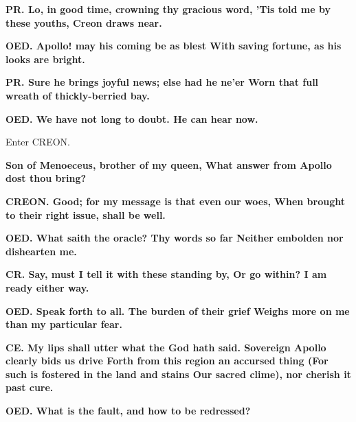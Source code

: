 \documentclass[11pt,letter]{book}
\begin{document}
\par \textbf{PR. Lo, in good time, crowning thy gracious word, ’Tis told me by these youths, Creon draws near.}
\par 

\par \textbf{OED. Apollo! may his coming be as blest With saving fortune, as his looks are bright.}
\par 

\par \textbf{PR. Sure he brings joyful news; else had he ne’er Worn that full wreath of thickly-berried bay.}
\par 

\par \textbf{OED. We have not long to doubt. He can hear now.}
\par 

\par  Enter CREON.

\par \textbf{Son of Menoeceus, brother of my queen, What answer from Apollo dost thou bring?}
\par 

\par \textbf{CREON. Good; for my message is that even our woes, When brought to their right issue, shall be well.}
\par 

\par \textbf{OED. What saith the oracle? Thy words so far Neither embolden nor dishearten me.}
\par 

\par \textbf{CR. Say, must I tell it with these standing by, Or go within? I am ready either way.}
\par 

\par \textbf{OED. Speak forth to all. The burden of their grief Weighs more on me than my particular fear.}
\par 

\par \textbf{CE. My lips shall utter what the God hath said. Sovereign Apollo clearly bids us drive Forth from this region an accursed thing (For such is fostered in the land and stains Our sacred clime), nor cherish it past cure.}
\par 

\par \textbf{OED. What is the fault, and how to be redressed?}
\par 
\end{document}
